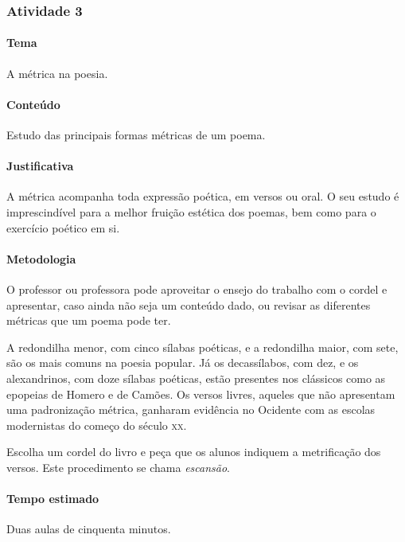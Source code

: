 \documentclass[11pt]{extarticle}
\begin{document}



\subsubsection{Atividade 3}

\paragraph{Tema} A métrica na poesia.

\paragraph{Conteúdo} Estudo das principais formas métricas de um poema.

\paragraph{Justificativa} A métrica acompanha toda expressão poética,
em versos ou oral. O seu estudo é imprescindível para a melhor fruição
estética dos poemas, bem como para o exercício poético em si.

\paragraph{Metodologia} O professor ou professora pode aproveitar o ensejo do trabalho com o cordel
e apresentar, caso ainda não seja um conteúdo dado, ou revisar as diferentes
métricas que um poema pode ter. 

A redondilha menor, com cinco sílabas poéticas, e a redondilha maior, com sete,
são os mais comuns na poesia popular. Já os decassílabos, com dez, e os alexandrinos,
com doze sílabas poéticas, estão presentes nos clássicos como as epopeias de Homero
e de Camões. Os versos livres, aqueles que não apresentam uma padronização métrica,
ganharam evidência no Ocidente com as escolas modernistas do começo do século \textsc{xx}.

Escolha um cordel do livro e peça que os alunos indiquem a metrificação dos versos. 
Este procedimento se chama \textit{escansão}.

\paragraph{Tempo estimado} Duas aulas de cinquenta minutos.
\end{document}
